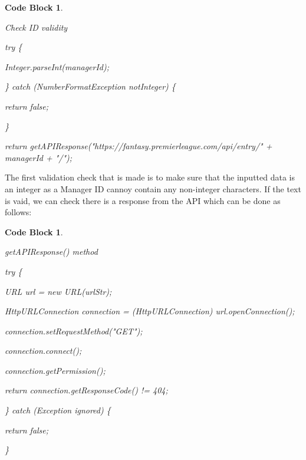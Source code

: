 \documentclass[12pt, a4paper, oneside]{book}
\newtheorem{codeblock}[theorem]{Code Block}
\numberwithin{equation}{section}
\begin{document}
\begin{codeblock} \label{Check ID validity}

  Check ID validity

  try \{
            
  \hspace{\parindent}Integer.parseInt(managerId);
        
  \} catch (NumberFormatException notInteger) \{
            
  \hspace{\parindent}return false;
        
  \}
        
  return getAPIResponse("https://fantasy.premierleague.com/api/entry/" + managerId + "/");

\end{codeblock}

The first validation check that is made is to make sure that the inputted data is an integer as a Manager ID cannoy contain any non-integer characters. If the text is vaid, we can check there is a response from the API which can be done as follows:

\begin{codeblock} \label{getAPIResponse method}

  getAPIResponse() method~\cite{HTTP response code in Java}

  try \{

  \hspace{\parindent}URL url = new URL(urlStr);

  \hspace{\parindent}HttpURLConnection connection = (HttpURLConnection) url.openConnection();

  \hspace{\parindent}connection.setRequestMethod("GET");

  \hspace{\parindent}connection.connect();

  \hspace{\parindent}connection.getPermission();

  \hspace{\parindent}return connection.getResponseCode() != 404;

  \} catch (Exception ignored) \{

  \hspace{\parindent}return false;

  \}

\end{codeblock}
\end{document}
